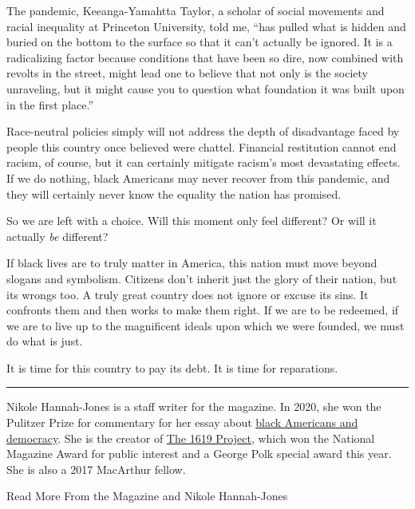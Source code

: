 The pandemic, Keeanga-Yamahtta Taylor, a scholar of social movements and
racial inequality at Princeton University, told me, ``has pulled what is
hidden and buried on the bottom to the surface so that it can't actually
be ignored. It is a radicalizing factor because conditions that have
been so dire, now combined with revolts in the street, might lead one to
believe that not only is the society unraveling, but it might cause you
to question what foundation it was built upon in the first place.''

Race-neutral policies simply will not address the depth of disadvantage
faced by people this country once believed were chattel. Financial
restitution cannot end racism, of course, but it can certainly mitigate
racism's most devastating effects. If we do nothing, black Americans may
never recover from this pandemic, and they will certainly never know the
equality the nation has promised.

So we are left with a choice. Will this moment only feel different? Or
will it actually \emph{be} different?

If black lives are to truly matter in America, this nation must move
beyond slogans and symbolism. Citizens don't inherit just the glory of
their nation, but its wrongs too. A truly great country does not ignore
or excuse its sins. It confronts them and then works to make them right.
If we are to be redeemed, if we are to live up to the magnificent ideals
upon which we were founded, we must do what is just.

It is time for this country to pay its debt. It is time for reparations.

\begin{center}\rule{0.5\linewidth}{\linethickness}\end{center}

Nikole Hannah-Jones is a staff writer for the magazine. In 2020, she won
the Pulitzer Prize for commentary for her essay about
\href{https://www.nytimes3xbfgragh.onion/interactive/2019/08/14/magazine/black-history-american-democracy.html}{black
Americans and democracy}. She is the creator of
\href{https://www.nytimes3xbfgragh.onion/interactive/2019/08/14/magazine/1619-america-slavery.html}{The
1619 Project}, which won the National Magazine Award for public interest
and a George Polk special award this year. She is also a 2017 MacArthur
fellow.

Read More From the Magazine and Nikole Hannah-Jones

\href{https://www.nytimes3xbfgragh.onion/interactive/2019/08/14/magazine/1619-america-slavery.html}{}

